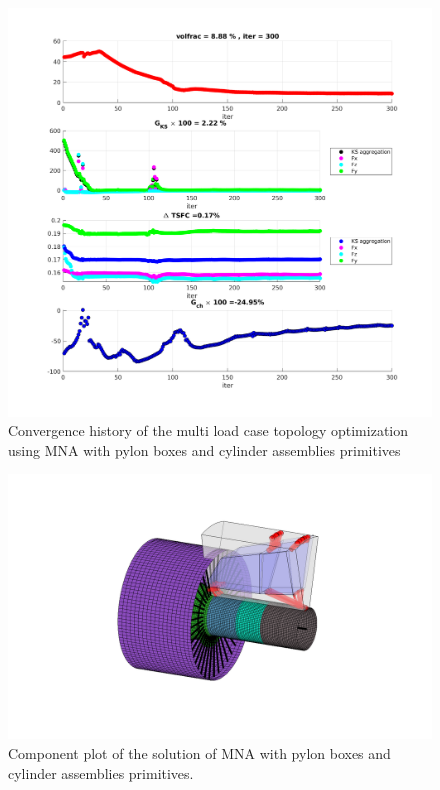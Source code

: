                      \begin{figure}[ht]
                       \centering
                       \includegraphics[width=\textwidth]{images/Ch3/pylon_convergence_300}
                       \caption{Convergence history of the multi load case topology optimization using MNA with pylon boxes and cylinder assemblies primitives}
                       \label{fig.3.44}
                       \end{figure}
                        \begin{figure}[ht]
                         \centering
                         \includegraphics[width=\textwidth]{images/Ch3/pylon_components_300}
                         \caption{Component plot of the solution of MNA with pylon boxes and cylinder assemblies primitives.}
                         \label{fig.3.45}
                         \end{figure}
